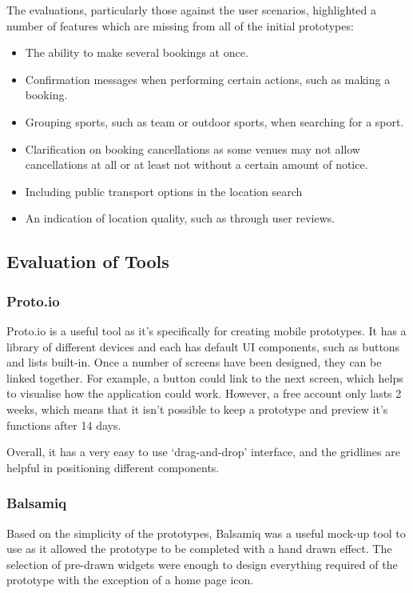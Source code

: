 The evaluations, particularly those against the user scenarios, highlighted a
number of features which are missing from all of the initial prototypes:

\begin{itemize}
	\item The ability to make several bookings at once.
	\item Confirmation messages when performing certain actions, such as making
		a booking.
	\item Grouping sports, such as team or outdoor sports, when searching for a
		sport.
	\item Clarification on booking cancellations as some venues may not allow
		cancellations at all or at least not without a certain amount of
		notice.
	\item Including public transport options in the location search
	\item An indication of location quality, such as through user reviews.
\end{itemize}

\subsection{Evaluation of Tools}

\subsubsection{Proto.io}

Proto.io\cite{protoio} is a useful tool as it's specifically for creating
mobile prototypes.  It has a library of different devices and each has default
UI components, such as buttons and lists built-in. Once a number of screens
have been designed, they can be linked together. For example, a button could
link to the next screen, which helps to visualise how the application could
work.  However, a free account only lasts 2 weeks, which means that it isn’t
possible to keep a prototype and preview it’s functions after 14 days.

Overall, it has a very easy to use `drag-and-drop' interface, and the gridlines
are helpful in positioning different components.

\subsubsection{Balsamiq}

Based on the simplicity of the prototypes, Balsamiq\cite{balsamiq} was a useful
mock-up tool to use as it allowed the prototype to be completed with a hand
drawn effect.  The selection of pre-drawn widgets were enough to design
everything required of the prototype with the exception of a home page icon.

